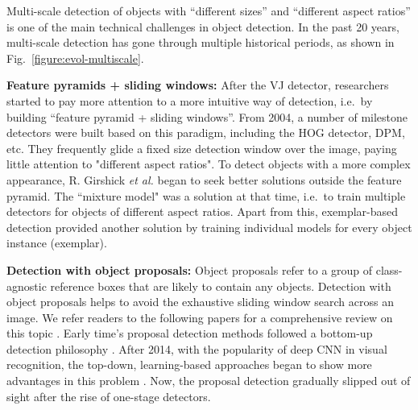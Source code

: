 \documentclass[lettersize,journal]{IEEEtran}
\begin{document}
Multi-scale detection of objects with ``different sizes'' and ``different aspect ratios'' is one of the main technical challenges in object detection. In the past 20 years, multi-scale detection has gone through multiple historical periods, as shown in Fig.\ \ref{figure:evol-multiscale}. 

\textbf{Feature pyramids + sliding windows:}
After the VJ detector, researchers started to pay more attention to a more intuitive way of detection, i.e.\ by building ``feature pyramid + sliding windows''. From 2004, a number of milestone detectors were built based on this paradigm, including the HOG detector, DPM, etc.
They frequently glide a fixed size detection window over the image, paying little attention to "different aspect ratios". To detect objects with a more complex appearance, R. Girshick \emph{et al.} began to seek better solutions outside the feature pyramid. The ``mixture model" \cite{TPAMI10-DPM} was a solution at that time, i.e.\ to train multiple detectors for objects of different aspect ratios. Apart from this, exemplar-based detection \cite{ICCV11-Exemplar, Thesis11-Exemplar} provided another solution by training individual models for every object instance (exemplar). 


\textbf{Detection with object proposals:} Object proposals refer to a group of class-agnostic reference boxes that are likely to contain any objects. 
Detection with object proposals helps to avoid the exhaustive sliding window search across an image. We refer readers to the following papers for a comprehensive review on this topic \cite{TPAMI14-ProposalSurvey, ECCV14-ProposalSurvey}. Early time's proposal detection methods followed a bottom-up detection philosophy \cite{CVPR10-WhatIsObj, TPAMI12-WhatIsObj}. 
After 2014, with the popularity of deep CNN in visual recognition, the top-down, learning-based approaches began to show more advantages in this problem \cite{CVPR14-BING, CVPR14-Scalable, NIPS15-FasterRCNN}. Now, the proposal detection gradually slipped out of sight after the rise of one-stage detectors.
\end{document}
